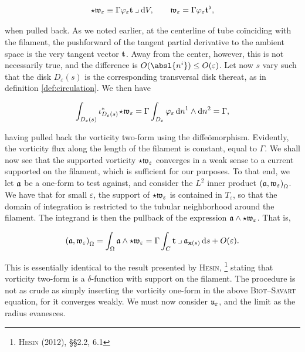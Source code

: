 \begin{equation}\label{eq:mollified-vorticity}
  \star\vorticityfrak_{\varepsilon} \equiv \Gamma \varphi_{\varepsilon} \tvec \iprod \dee V, \qquad \vorticityfrak_{\varepsilon} = \Gamma \varphi_{\varepsilon} \tvec^{\flat},
\end{equation}

\noindent
when pulled back.
As we noted earlier, at the centerline of tube coïnciding with the filament, the pushforward of the tangent partial derivative to the ambient space is the very tangent vector $\mathbf{t}$.
Away from the center, however, this is not necessarily true, and the difference is $O(\absl{n^i}) \leq O(\varepsilon)$.
Let now $s$ vary such that the disk $D_{\varepsilon}(s)$ is the corresponding transversal disk thereat, as in definition \ref{def:circulation}.
We then have

\begin{equation}
  \int_{D_{\varepsilon}(s)} \iota_{D_{\varepsilon}(s)}^{\ast} \!\star\! \mathfrak{w}_{\varepsilon} = \Gamma \int_{D_{\varepsilon}} \varphi_{\varepsilon} \,\mathrm{d} n^1 \wedge \mathrm{d} n^2 = \Gamma,
\end{equation}

\noindent
having pulled back the vorticity two-form using the diffeömorphism.
Evidently, the vorticity flux along the length of the filament is constant, equal to $\Gamma$.
We shall now see that the supported vorticity $\star\mathfrak{w}_{\varepsilon}$ converges in a weak sense to a current supported on the filament, which is sufficient for our purposes.
To that end, we let $\mathfrak{a}$ be a one-form to test against, and consider the $L^2$ inner product ${(\mathfrak{a}, \mathfrak{w}_{\varepsilon})}_{\Omega}$.
We have that for small $\varepsilon$, the support of $\star\mathfrak{w}_{\varepsilon}$ is contained in $T_{\varepsilon}$, so that the domain of integration is restricted to the tubular neighborhood around the filament.
The integrand is then the pullback of the expression $\mathfrak{a} \wedge \star\mathfrak{w}_{\varepsilon}$.
That is,

\begin{equation}
  {(\afrak, \vorticityfrak_{\varepsilon})}_{\Omega} = \int_{\Omega} \afrak \wedge \star\vorticityfrak_{\varepsilon} = \Gamma \int_{C} \tvec \iprod \afrak_{\xvec(s)} \,\dee s + O(\varepsilon).
\end{equation}

\noindent
This is essentially identical to the result presented by \textsc{Hesin},%
\footnote{%
  \cite{hesin2012symplectic} \textsc{Hesin} (2012), \S\S2.2, 6.1
}
stating that vorticity two-form is a $\delta$-function with support on the filament.
The procedure is not as crude as simply inserting the vorticity one-form in the above \textsc{Biot}--\textsc{Savart} equation, for it converges weakly.
We must now consider $\mathfrak{u}_{\varepsilon}$, and the limit as the radius evanesces.

